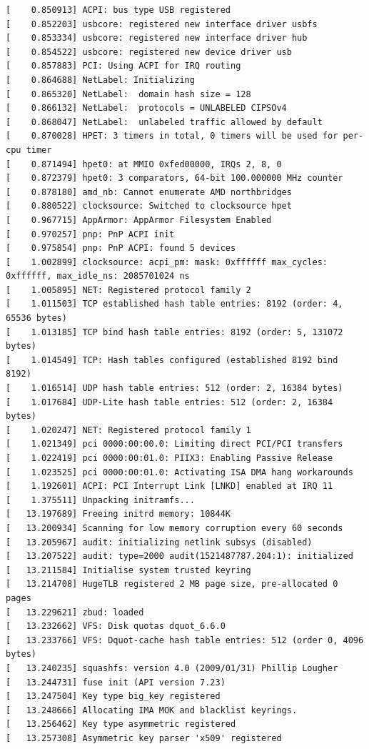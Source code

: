 \documentclass[12pt]{article}
\begin{document}
\begin{verbatim}
[    0.850913] ACPI: bus type USB registered
[    0.852203] usbcore: registered new interface driver usbfs
[    0.853334] usbcore: registered new interface driver hub
[    0.854522] usbcore: registered new device driver usb
[    0.857883] PCI: Using ACPI for IRQ routing
[    0.864688] NetLabel: Initializing
[    0.865320] NetLabel:  domain hash size = 128
[    0.866132] NetLabel:  protocols = UNLABELED CIPSOv4
[    0.868047] NetLabel:  unlabeled traffic allowed by default
[    0.870028] HPET: 3 timers in total, 0 timers will be used for per-cpu timer
[    0.871494] hpet0: at MMIO 0xfed00000, IRQs 2, 8, 0
[    0.872379] hpet0: 3 comparators, 64-bit 100.000000 MHz counter
[    0.878180] amd_nb: Cannot enumerate AMD northbridges
[    0.880522] clocksource: Switched to clocksource hpet
[    0.967715] AppArmor: AppArmor Filesystem Enabled
[    0.970257] pnp: PnP ACPI init
[    0.975854] pnp: PnP ACPI: found 5 devices
[    1.002899] clocksource: acpi_pm: mask: 0xffffff max_cycles: 0xffffff, max_idle_ns: 2085701024 ns
[    1.005895] NET: Registered protocol family 2
[    1.011503] TCP established hash table entries: 8192 (order: 4, 65536 bytes)
[    1.013185] TCP bind hash table entries: 8192 (order: 5, 131072 bytes)
[    1.014549] TCP: Hash tables configured (established 8192 bind 8192)
[    1.016514] UDP hash table entries: 512 (order: 2, 16384 bytes)
[    1.017684] UDP-Lite hash table entries: 512 (order: 2, 16384 bytes)
[    1.020247] NET: Registered protocol family 1
[    1.021349] pci 0000:00:00.0: Limiting direct PCI/PCI transfers
[    1.022419] pci 0000:00:01.0: PIIX3: Enabling Passive Release
[    1.023525] pci 0000:00:01.0: Activating ISA DMA hang workarounds
[    1.192601] ACPI: PCI Interrupt Link [LNKD] enabled at IRQ 11
[    1.375511] Unpacking initramfs...
[   13.197689] Freeing initrd memory: 10844K
[   13.200934] Scanning for low memory corruption every 60 seconds
[   13.205967] audit: initializing netlink subsys (disabled)
[   13.207522] audit: type=2000 audit(1521487787.204:1): initialized
[   13.211584] Initialise system trusted keyring
[   13.214708] HugeTLB registered 2 MB page size, pre-allocated 0 pages
[   13.229621] zbud: loaded
[   13.232662] VFS: Disk quotas dquot_6.6.0
[   13.233766] VFS: Dquot-cache hash table entries: 512 (order 0, 4096 bytes)
[   13.240235] squashfs: version 4.0 (2009/01/31) Phillip Lougher
[   13.244731] fuse init (API version 7.23)
[   13.247504] Key type big_key registered
[   13.248666] Allocating IMA MOK and blacklist keyrings.
[   13.256462] Key type asymmetric registered
[   13.257308] Asymmetric key parser 'x509' registered

\end{verbatim}
\end{document}
